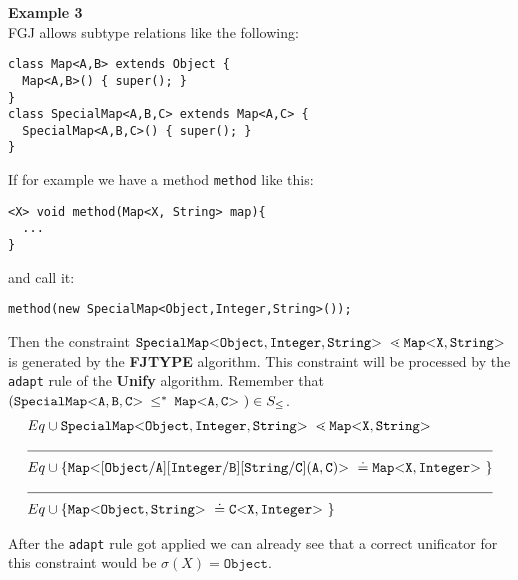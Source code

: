 \documentclass[runningheads]{llncs}
\begin{document}
\textbf{Example 3}\\
FGJ allows subtype relations like the following:
\begin{lstlisting}
class Map<A,B> extends Object {
  Map<A,B>() { super(); }
}
class SpecialMap<A,B,C> extends Map<A,C> {
  SpecialMap<A,B,C>() { super(); }
}
\end{lstlisting}

If for example we have a method \texttt{method} like this:
\begin{lstlisting}
<X> void method(Map<X, String> map){
  ...
}
\end{lstlisting}
and call it:
\begin{lstlisting}
method(new SpecialMap<Object,Integer,String>());
\end{lstlisting}

Then the constraint $\mathtt{SpecialMap {\tt <} Object,Integer,String {\tt >} \ } \lessdot \mathtt{Map {\tt <} X,String {\tt >} \ }$
is generated by the \textbf{FJTYPE} algorithm.
This constraint will be processed by the \texttt{adapt} rule of the \textbf{Unify} algorithm.
Remember that $(\mathtt{SpecialMap {\tt <} A,B,C {\tt >} \ } \textrm{$\, \leq^\ast \,$}\  \mathtt{Map {\tt <} A,C {\tt >} \ }) \in S_\leq$.
\begin{align*}
  Eq& \cup \exptype{SpecialMap}{Object,Integer,String} \lessdot \exptype{Map}{X,String} \\
  \cline{1-2} 
  Eq& \cup \set{\exptype{Map}{[ Object / A ][ Integer / B ][ String / C ](A,C)}
  \doteq \exptype{Map}{X,Integer}} \\
  \cline{1-2} 
  Eq& \cup \set{\exptype{Map}{Object,String}
  \doteq \exptype{C}{X, Integer}}
\end{align*}

After the \texttt{adapt} rule got applied we can already see that a correct unificator for this constraint would be
$\sigma(X) = \texttt{Object}$.
\end{document}
